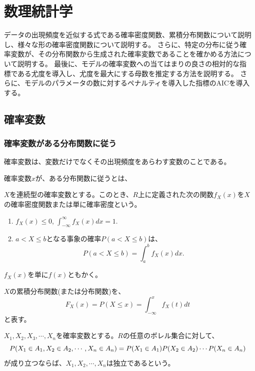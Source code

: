 \chapter{数理統計学}
データの出現頻度を近似する式である確率密度関数、累積分布関数について説明し、様々な形の確率密度関数について説明する。
さらに、特定の分布に従う確率変数が、その分布関数から生成された確率変数であることを確かめる方法について説明する。
最後に、モデルの確率変数への当てはまりの良さの相対的な指標である尤度を導入し、尤度を最大にする母数を推定する方法を説明する。
さらに、モデルのパラメータの数に対するペナルティを導入した指標のAICを導入する。


\section{確率変数}
\subsection{確率変数がある分布関数に従う}
確率変数は、変数だけでなくその出現頻度をあらわす変数のことである。



確率変数$x$が、ある分布関数に従うとは、
\begin{defi}
 $X$を連続型の確率変数とする。このとき、$R$上に定義された次の関数$f_X(x)$を$X$の確率密度関数または単に確率密度という。
 \begin{enumerate}
  \item $f_X(x) \leq 0 $, $\int_{-\infty}^{\infty} f_X(x)dx=1$.
  \item $a<X\leq b$となる事象の確率$P(a<X\leq b)$は、
        \begin{equation}
         P(a<X\leq b) = \int_a^b f_X(x)dx.
        \end{equation}
 \end{enumerate}
 $f_X(x)$を単に$f(x)$ともかく。

$X$の累積分布関数(または分布関数)を、
\begin{equation*}
 F_X(x)=P(X\leq x) = \int_{-\infty}^x f_X(t)dt
\end{equation*}
と表す。
\end{defi}

\begin{defi}
 $X_1,X_2,X_3,\cdots,X_n$を確率変数とする。$R$の任意のボレル集合に対して、
 \begin{equation*}
  P(X_1 \in A_1, X_2 \in A_2,\cdots, X_n \in A_n) = P(X_1 \in A_1)P(X_2\in A_2)\cdots P(X_n \in A_n)\\
 \end{equation*}
が成り立つならば、$X_1,X_2,\cdots,X_n$は独立であるという。
\end{defi}

